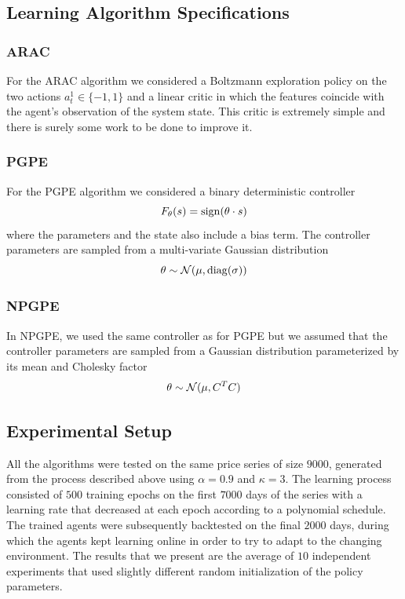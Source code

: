 \subsection{Learning Algorithm Specifications}

\subsubsection{ARAC} 
For the ARAC algorithm we considered a Boltzmann exploration policy on the two actions $a_t^1 \in \{-1, 1\}$ and a linear critic in which the features coincide with the agent's observation of the system state. This critic is extremely simple and there is surely some work to be done to improve it. 

\subsubsection{PGPE}
For the PGPE algorithm we considered a binary deterministic controller 
\begin{equation*}
	F_\theta(s) = \operatorname{sign}(\theta \cdot s)
\end{equation*}
where the parameters and the state also include a bias term. The controller parameters are sampled from a multi-variate Gaussian distribution
\begin{equation*}
	\theta \sim \mathcal{N}(\mu, \operatorname{diag}(\sigma))
\end{equation*}  

\subsubsection{NPGPE}
In NPGPE, we used the same controller as for PGPE but we assumed that the controller parameters are sampled from a Gaussian distribution parameterized by its mean and Cholesky factor
\begin{equation*}
	\theta \sim \mathcal{N}(\mu, C^T C)
\end{equation*}  


\subsection{Experimental Setup}   
All the algorithms were tested on the same price series of size $9000$, generated from the process described above using $\alpha = 0.9$ and $\kappa = 3$. The learning process consisted of $500$ training epochs on the first $7000$ days of the series with a learning rate that decreased at each epoch according to a polynomial schedule. The trained agents were subsequently backtested on the final $2000$ days, during which the agents kept learning online in order to try to adapt to the changing environment. The results that we present are the average of $10$ independent experiments that used slightly different random initialization of the policy parameters.   

